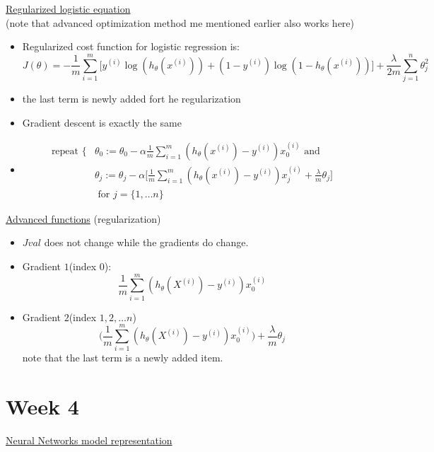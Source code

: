 \documentclass[12pt]{article}
\begin{document}
\underline{Regularized logistic equation} \\
(note that advanced optimization method me mentioned earlier also works here)

\begin{itemize}
	\item Regularized cost function for logistic regression is:
	\[J(\theta) = -\frac{1}{m}\sum_{i=1}^{m} \big[y^{(i)}\log(h_\theta (x^{(i)} ))+ (1-y^{(i)}) \log (1-h_\theta(x^{(i)}))\big] + \frac{\lambda}{2m}\sum_{j=1}^{n}\theta_j^2\] 
	\item the last term is newly added fort he regularization
	\item Gradient descent is exactly the same	\item \begin{align*}
	\text{repeat } \{ &
	\theta_0 := \theta_0 - \alpha\frac{1}{m}\sum_{i=1}^{m} (h_\theta(x^{(i)})-y^{(i)})x_0^{(i)} \text{ and}\\
	&\theta_j := \theta_j - \alpha\big[\frac{1}{m}\sum_{i=1}^{m} (h_\theta(x^{(i)})-y^{(i)})x_j^{(i)} + \frac{\lambda}{m}\theta_j\big] \\ 
	&\text{ for } j = \{1,\ldots n\}	\end{align*}
\end{itemize}

\underline{Advanced functions} (regularization)
\begin{itemize}
	\item $Jval$ does not change while the gradients do change.
	\item Gradient $1$(index $0$):
	\[\frac{1}{m} \sum_{i=1}^{m}(h_\theta(X^{(i)} )- y^{(i)})x_0^{(i)} \]
	\item Gradient $2$(index $1,2,\ldots n$)
	\[\big(   \frac{1}{m} \sum_{i=1}^{m}(h_\theta(X^{(i)} )- y^{(i)})x_0^{(i)}   \big) +\frac{\lambda}{m}\theta_j\] note that the last term is a newly added item.
\end{itemize}
\newpage
\section*{Week 4}

\underline{Neural Networks model representation}
\end{document}
